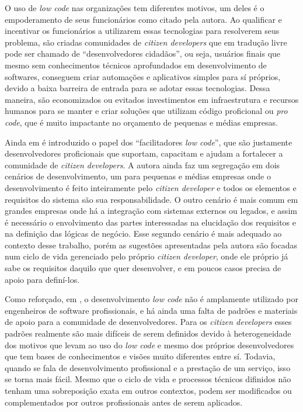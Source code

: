 		{\color{blue}O uso de \textit{low code} nas organizações tem diferentes motivos, um deles é o empoderamento de seus funcionários como citado \cite{LowCodeLifeCicle} pela autora. 
		Ao qualificar e incentivar os funcionários a utilizarem essas tecnologias para resolverem seus problema, são criadas comunidades de \textit{citizen developers} que em tradução
		livre pode ser chamado de ``desenvolvedores cidadãos'', ou seja, usuários finais que mesmo sem conhecimentos técnicos aprofundados em desenvolvimento de softwares, conseguem criar
		automações e aplicativos simples para sí próprios, devido a baixa barreira de entrada para se adotar essas tecnologias. Dessa maneira, são economizados ou evitados investimentos em
		infraestrutura e recursos humanos para se manter e criar soluções que utilizam código proficional ou \textit{pro code}, que é muito impactante no orçamento de pequenas e médias empresas.

		Ainda em \cite{LowCodeLifeCicle} é introduzido o papel dos ``facilitadores \textit{low code}'', que são justamente desenvolvedores proficionais que suportam, capacitam e ajudam a
		fortalecer a comunidade de \textit{citizen developers}. A autora ainda faz um segregação em dois cenários de desenvolvimento, um para pequenas e médias empresas onde o desenvolvimento
		é feito inteiramente pelo \textit{citizen developer} e todos os elementos e requisitos do sistema são sua responsabilidade. O outro cenário é mais comum em grandes empresas onde há 
		a integração com sistemas externos ou legados, e assim é necessário o envolvimento das partes interessadas na elucidação dos requisitos e na definição das lógicas de negócio. Esse
		segundo cenário é mais adequado ao contexto desse trabalho, porém as sugestões apresentadas pela autora são focadas num ciclo de vida gerenciado pelo próprio \textit{citizen developer},
		onde ele próprio já sabe os requisitos daquilo que quer desenvolver, e em poucos casos precisa de apoio para definí-los.

		Como reforçado, em \cite{LowCodeLifeCicle}, o desenvolvimento \textit{low code} não é amplamente utilizado por engenheiros de software profissionais, e há ainda uma falta de padrões e
		materiais de apoio para a comunidade de desenvolvedores. Para os \textit{citizen developers} esses padrões realmente são mais difíceis de serem definidos devido à heterogeneidade dos
		motivos que levam ao uso do \textit{low code} e mesmo dos próprios desenvolvedores que tem bases de conhecimentos e visões muito diferentes entre sí. Todavia, quando se fala de desenvolvimento
		profissional e a prestação de um serviço, isso se torna mais fácil. Mesmo que o ciclo de vida e processos técnicos difinidos não tenham uma sobreposição exata em outros contextos, podem 
		ser modificados ou complementados por outros profissionais antes de serem aplicados.


		}
